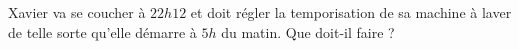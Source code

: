 
\begin{mental}
    Xavier va se coucher à \( 22h12\) et doit régler la temporisation de sa machine à laver de telle sorte qu'elle démarre à \( 5h\) du matin. Que doit-il faire ?
\end{mental}
